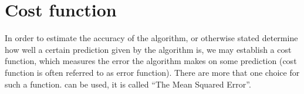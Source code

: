 %
%
%
%
%
%
%


\section{Cost function}\label{cost}

In order to estimate the accuracy of the algorithm, or otherwise stated determine how well a certain prediction given by the algorithm is, we may establish a cost function, which measures the error the algorithm makes on some prediction (cost function is often referred to as error function). There are more that one choice for such a function.  can be used, it is called ``The Mean Squared Error''.

